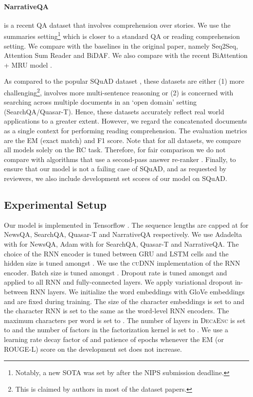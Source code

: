 \documentclass{article}
\begin{document}
\paragraph{NarrativeQA} \citep{kovcisky2017narrativeqa} is a recent QA dataset that involves comprehension over stories. We use the summaries setting\footnote{Notably, a new SOTA was set by \citep{hu2018attention} after the NIPS submission deadline.} which is closer to a standard QA or reading comprehension setting. We compare with the baselines in the original paper, namely Seq2Seq, Attention Sum Reader and BiDAF. We also compare with the recent BiAttention + MRU model \citep{tay2018multi}.

As compared to the popular SQuAD dataset \citep{rajpurkar2016squad}, these datasets are either (1) more challenging\footnote{This is claimed by authors in most of the dataset papers.}, involves more multi-sentence reasoning or (2) is concerned with searching across multiple documents in an `open domain' setting (SearchQA/Quasar-T). Hence, these datasets accurately reflect real world applications to a greater extent. However, we regard the concatenated documents as a single context for performing reading comprehension. The evaluation metrics are the EM (exact match) and F1 score. Note that for all datasets,
we compare all models solely on the RC task. Therefore, for fair comparison we do not compare with algorithms that use a second-pass answer re-ranker \citep{wang2017evidence}. Finally, to ensure that our model is not a failing case of SQuAD, and as requested by reviewers, we also include development set scores of our model on SQuAD.
\subsection{Experimental Setup}
Our model is implemented in Tensorflow \citep{tensorflow2015-whitepaper}. The sequence lengths are capped at  for NewsQA, SearchQA, Quasar-T and NarrativeQA respectively. We use Adadelta \citep{zeiler2012adadelta} with  for NewsQA, Adam \citep{DBLP:journals/corr/KingmaB14} with  for SearchQA, Quasar-T and NarrativeQA. The choice of the RNN encoder is tuned between GRU and LSTM cells and the hidden size is tuned amongst . We use the \textsc{cuDNN} implementation of the RNN encoder. Batch size is tuned amongst . Dropout rate is tuned amongst  and applied to all RNN and fully-connected layers. We apply variational dropout \citep{gal2016theoretically} in-between RNN layers. We initialize the word embeddings with  GloVe embeddings \citep{DBLP:conf/emnlp/PenningtonSM14} and are fixed during training. The size of the character embeddings is set to  and the character RNN is set to the same as the word-level RNN encoders. The maximum characters per word is set to . The number of layers in \textsc{DecaEnc} is set to  and the number of factors in the factorization kernel is set to . We use a learning rate decay factor of  and patience of  epochs whenever the EM (or ROUGE-L) score on the development set does not increase.
\end{document}
